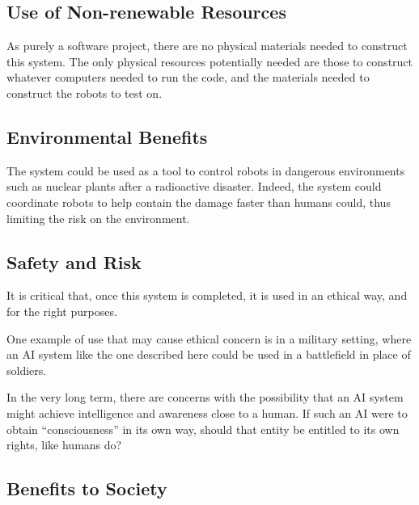 \documentclass[titlepage,11pt]{article}
\begin{document}
\subsection{Use of Non-renewable Resources}

As purely a software project, there are no physical materials needed to construct this system. The only physical resources potentially needed are those to construct whatever computers needed to run the code, and the materials needed to construct the robots to test on.

\subsection{Environmental Benefits}

The system could be used as a tool to control robots in dangerous environments such as nuclear plants after a radioactive disaster. Indeed, the system could coordinate robots to help contain the damage faster than humans could, thus limiting the risk on the environment.

\subsection{Safety and Risk}

It is critical that, once this system is completed, it is used in an ethical way, and for the right purposes.

One example of use that may cause ethical concern is in a military setting, where an AI system like the one described here could be used in a battlefield in place of soldiers.

In the very long term, there are concerns with the possibility that an AI system might achieve intelligence and awareness close to a human. If such an AI were to obtain ``consciousness'' in its own way, should that entity be entitled to its own rights, like humans do?

\subsection{Benefits to Society}
\end{document}
